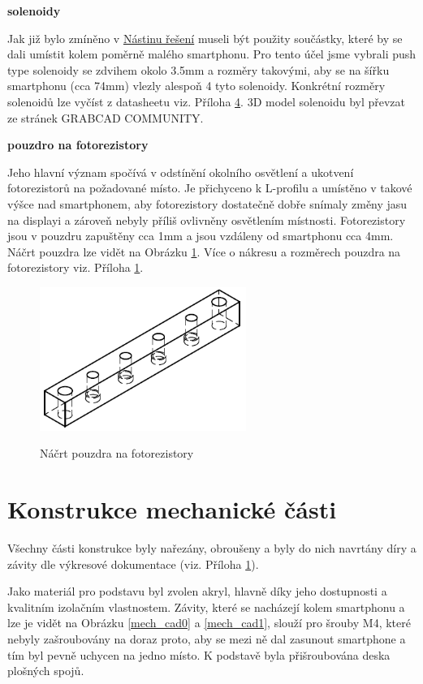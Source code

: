 \documentclass[12pt,oneside]{book} %
\begin{document}
\textbf{solenoidy}

\qquad Jak již bylo zmíněno v \hyperref[nastin]{Nástinu řešení} museli být použity součástky, které by se dali umístit kolem poměrně malého smartphonu. Pro tento účel jsme vybrali push type solenoidy se zdvihem okolo 3.5mm a rozměry takovými, aby se na šířku smartphonu (cca 74mm) vlezly alespoň 4 tyto solenoidy. Konkrétní rozměry solenoidů lze vyčíst z datasheetu viz. Příloha \hyperref[Prilohy]{4}. 3D model solenoidu byl převzat ze stránek GRABCAD COMMUNITY. \cite{grabcad}

\pagebreak
\textbf{pouzdro na fotorezistory}

\qquad Jeho hlavní význam spočívá v odstínění okolního osvětlení a ukotvení fotorezistorů na požadované místo. Je přichyceno k L-profilu a umístěno v takové výšce nad smartphonem, aby fotorezistory dostatečně dobře snímaly změny jasu na displayi a zároveň nebyly příliš ovlivněny osvětlením místnosti. Fotorezistory jsou v pouzdru zapuštěny cca 1mm a jsou vzdáleny od smartphonu cca 4mm. Náčrt pouzdra lze vidět na Obrázku \ref{pouzdro}. Více o nákresu a rozměrech pouzdra na fotorezistory viz. Příloha \hyperref[Prilohy]{1}.

\begin{figure}[ht] \large\centering
\includegraphics[width=0.60\textwidth]{./img/pouzdro.png}\\[1cm] 
\caption{Náčrt pouzdra na fotorezistory}
\label{pouzdro}
\end{figure}  

\chapter{Konstrukce mechanické části}\label{konstr}
\qquad Všechny části konstrukce byly nařezány, obroušeny a byly do nich navrtány díry a závity dle výkresové dokumentace (viz. Příloha \hyperref[Prilohy]{1}).

\qquad Jako materiál pro podstavu byl zvolen akryl, hlavně díky jeho dostupnosti a kvalitním izolačním vlastnostem. Závity, které se nacházejí kolem smartphonu a lze je vidět na Obrázku \ref{mech_cad0} a \ref{mech_cad1}, slouží pro šrouby M4, které nebyly zašroubovány na doraz proto, aby se mezi ně dal zasunout smartphone a tím byl pevně uchycen na jedno místo. K podstavě byla přišroubována deska plošných spojů.
\end{document}

